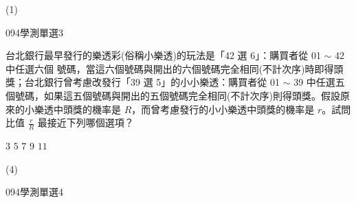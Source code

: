 \begin{QUESTIONS}
\begin{QUESTION}
\begin{QANS}
            (1)
        \end{QANS}
        \begin{QSOLLIST}
        \end{QSOLLIST}
        \begin{QEMPTYSPACE}
        \end{QEMPTYSPACE}
    \end{QUESTION}
    \begin{QUESTION}
        \begin{ExamInfo}{094}{學測}{單選}{3}
        \end{ExamInfo}
        \begin{ExamAnsRateInfo}{52}{82}{54}{20}
        \end{ExamAnsRateInfo}
        \begin{QBODY}
			台北銀行最早發行的樂透彩(俗稱小樂透)的玩法是「42 選 6」：購買者從 01 $\sim$ 42 中任選六個 號碼，當這六個號碼與開出的六個號碼完全相同(不計次序)時即得頭獎；台北銀行曾考慮改發行「39 選 5」的小小樂透：購買者從 01 $\sim$ 39 中任選五個號碼，如果這五個號碼與開出的五個號碼完全相同(不計次序)則得頭獎。假設原來的小樂透中頭獎的機率是 $R$，而曾考慮發行的小小樂透中頭獎的機率是 $r$。試問比值 $\frac{r}{R}$ 最接近下列哪個選項？
			\begin{QOPS}
				\QOP $3$
				\QOP $5$
				\QOP $7$
				\QOP $9$
				\QOP $11$
			\end{QOPS}
        \end{QBODY}
        \begin{QFROMS}
        \end{QFROMS}
        \begin{QTAGS}\end{QTAGS}
        \begin{QANS}
            (4)
        \end{QANS}
        \begin{QSOLLIST}
        \end{QSOLLIST}
        \begin{QEMPTYSPACE}
        \end{QEMPTYSPACE}
    \end{QUESTION}
    \begin{QUESTION}
        \begin{ExamInfo}{094}{學測}{單選}{4}
        \end{ExamInfo}
        \begin{ExamAnsRateInfo}{32}{65}{21}{10}
        \end{ExamAnsRateInfo}
        \begin{QBODY}

\end{QBODY}
\end{QUESTION}
\end{QUESTIONS}
